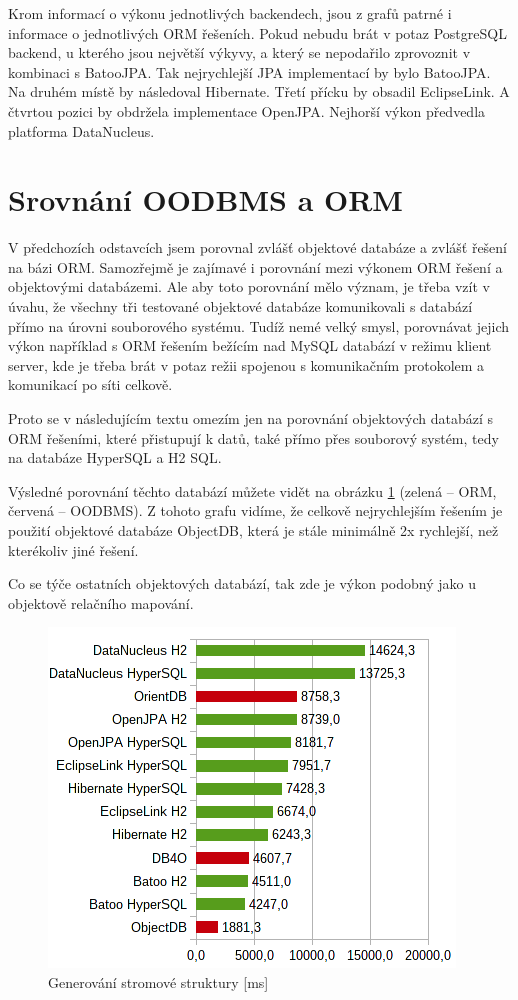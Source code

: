 Krom informací o výkonu jednotlivých backendech, jsou z grafů patrné i informace o jednotlivých ORM řešeních. Pokud nebudu brát v potaz PostgreSQL backend, u kterého jsou největší výkyvy, a který se nepodařilo zprovoznit v kombinaci s BatooJPA. Tak nejrychlejší JPA implementací by bylo BatooJPA. Na druhém místě by následoval Hibernate. Třetí přícku by obsadil EclipseLink. A čtvrtou pozici by obdržela implementace OpenJPA. Nejhorší výkon předvedla platforma DataNucleus.

\section{Srovnání OODBMS a ORM}
V předchozích odstavcích jsem porovnal zvlášť objektové databáze a zvlášť řešení na bázi ORM. Samozřejmě je zajímavé i porovnání mezi výkonem ORM řešení a objektovými databázemi. Ale aby toto porovnání mělo význam, je třeba vzít v úvahu, že všechny tři testované objektové databáze komunikovali s databází přímo na úrovni souborového systému. Tudíž nemé velký smysl, porovnávat jejich výkon například s ORM řešením bežícím nad MySQL databází v režimu klient server, kde je třeba brát v potaz režii spojenou s komunikačním protokolem a komunikací po síti celkově.

Proto se v následujícím textu omezím jen na porovnání objektových databází s ORM řešeními, které přistupují k datů, také přímo přes souborový systém, tedy na databáze HyperSQL a H2 SQL.

Výsledné porovnání těchto databází můžete vidět na obrázku \ref{img:resultf} (zelená -- ORM, červená -- OODBMS). Z tohoto grafu vidíme, že celkově nejrychlejším řešením je použití objektové databáze ObjectDB, která je stále minimálně 2x rychlejší, než kterékoliv jiné řešení.

Co se týče ostatních objektových databází, tak zde je výkon podobný jako u objektově relačního mapování.
\begin{figure}[!h]
  \includegraphics[]{obr/bench/resultf}
  \caption{Generování stromové struktury [ms]}\label{img:resultf}
\end{figure}
